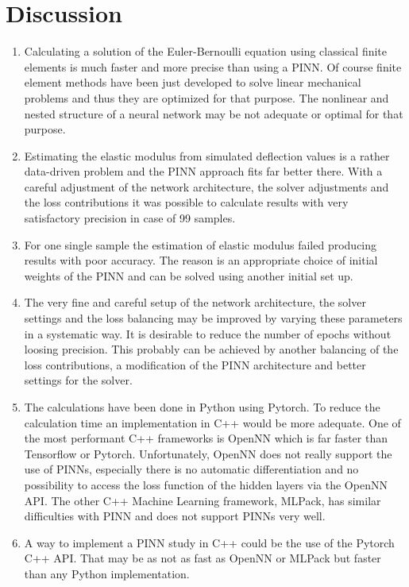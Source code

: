 \documentclass[a4paper,11pt]{article}
\begin{document}
\section{Discussion}
\begin{enumerate}
\item
Calculating a solution of the Euler-Bernoulli equation using classical finite elements is much faster and more precise than using a PINN. Of course finite element methods have been just developed to solve linear mechanical problems and thus they are optimized for that purpose. The nonlinear and nested structure of  a neural network may be not adequate or optimal for that purpose.
\item
Estimating the elastic modulus from simulated deflection values is a rather data-driven problem and the PINN approach fits far better there. With a careful adjustment of the network architecture, the solver adjustments and the loss contributions it was possible to calculate results with very satisfactory precision in case of 99 samples.
\item
For one single sample the estimation of elastic modulus failed producing results with poor accuracy. The reason is an appropriate choice of initial weights of the PINN and can be solved using another initial set up.
\item
The very fine and careful setup of the network architecture, the solver settings and the loss balancing may be improved by varying these parameters in a systematic way. It is desirable to reduce the number of epochs without loosing precision. This probably can be achieved by another balancing of the loss contributions, a modification of the PINN architecture and better settings for the solver.
\item
The calculations have been done in Python using Pytorch. To reduce the calculation time an implementation in C++ would be more adequate. One of the most performant  C++ frameworks is OpenNN which is far faster than Tensorflow or Pytorch. Unfortunately, OpenNN does not really support the use of PINNs, especially there is no automatic differentiation and no possibility to access the loss function of the hidden layers via the OpenNN API. The other C++ Machine Learning framework, MLPack, has similar difficulties with PINN and does not support PINNs very well.
\item
A way to implement a PINN study in C++ could be the use of the Pytorch C++ API. That may be as not as fast as OpenNN or MLPack but faster than any Python implementation.
\end{enumerate}
\end{document}
